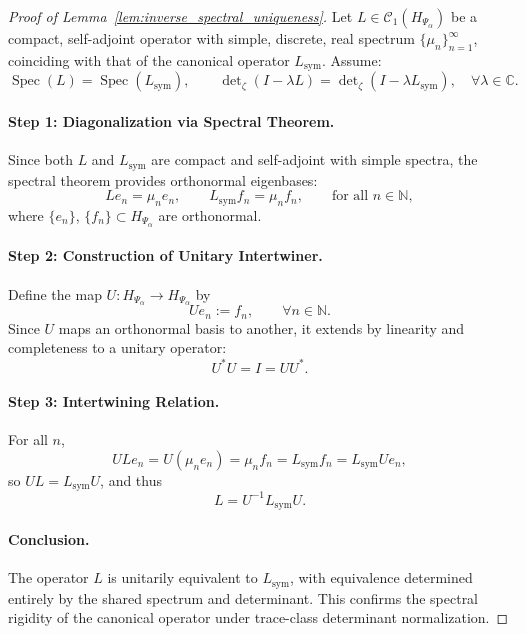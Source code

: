 \begin{proof}[Proof of Lemma~\ref{lem:inverse_spectral_uniqueness}]
Let \( L \in \mathcal{C}_1(H_{\Psi_\alpha}) \) be a compact, self-adjoint operator with simple, discrete, real spectrum \( \{ \mu_n \}_{n=1}^\infty \), coinciding with that of the canonical operator \( L_{\mathrm{sym}} \). Assume:
\[
\operatorname{Spec}(L) = \operatorname{Spec}(L_{\mathrm{sym}}), \qquad
\det\nolimits_\zeta(I - \lambda L) = \det\nolimits_\zeta(I - \lambda L_{\mathrm{sym}}), \quad \forall \lambda \in \mathbb{C}.
\]

\paragraph{Step 1: Diagonalization via Spectral Theorem.}
Since both \( L \) and \( L_{\mathrm{sym}} \) are compact and self-adjoint with simple spectra, the spectral theorem provides orthonormal eigenbases:
\[
L e_n = \mu_n e_n, \qquad L_{\mathrm{sym}} f_n = \mu_n f_n, \qquad \text{for all } n \in \mathbb{N},
\]
where \( \{e_n\} \), \( \{f_n\} \subset H_{\Psi_\alpha} \) are orthonormal.

\paragraph{Step 2: Construction of Unitary Intertwiner.}
Define the map \( U : H_{\Psi_\alpha} \to H_{\Psi_\alpha} \) by
\[
U e_n := f_n, \qquad \forall n \in \mathbb{N}.
\]
Since \( U \) maps an orthonormal basis to another, it extends by linearity and completeness to a unitary operator:
\[
U^* U = I = UU^*.
\]

\paragraph{Step 3: Intertwining Relation.}
For all \( n \),
\[
U L e_n = U (\mu_n e_n) = \mu_n f_n = L_{\mathrm{sym}} f_n = L_{\mathrm{sym}} U e_n,
\]
so \( U L = L_{\mathrm{sym}} U \), and thus
\[
L = U^{-1} L_{\mathrm{sym}} U.
\]

\paragraph{Conclusion.}
The operator \( L \) is unitarily equivalent to \( L_{\mathrm{sym}} \), with equivalence determined entirely by the shared spectrum and determinant. This confirms the spectral rigidity of the canonical operator under trace-class determinant normalization.
\end{proof}
